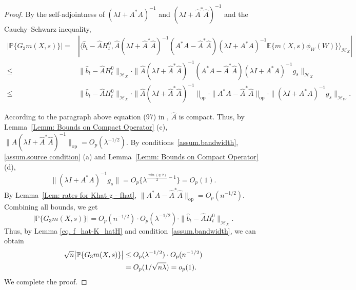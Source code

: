 \documentclass[
  12pt]{article}
\def\wh{\widehat}
\def\mP{\mathbb{P}}
\begin{document}
\begin{proof}
By the self-adjointness of $(\lambda I+A^*A)^{-1}$ and $(\lambda I+\wh{A}^*\wh{A})^{-1}$ and the Cauchy--Schwarz inequality,
\begin{align*}
	\left| \mathbb{P} \{ G_3m(X,s) \}\right|
    =&\left| \langle \widehat{b}_t-\widehat{A}H^0_t,\widehat{A}(\lambda I+\widehat{A}^*\widehat{A})^{-1}(A^*A-\widehat{A}^*\widehat{A})(\lambda I+A^*A)^{-1}\mathbb{E} \{ m(X,s)\phi_W(W)\} \rangle_{\mathcal{H}_X} \right|\\
    \le&\| \widehat{b}_t-\widehat{A}H^0_t\|_{\mathcal{H}_X}\cdot \| \widehat{A}(\lambda I+\widehat{A}^*\widehat{A})^{-1}(A^*A-\widehat{A}^*\widehat{A})(\lambda I+A^*A)^{-1}g_s \|_{\mathcal{H}_X}\\
	\le&\| \widehat{b}_t-\widehat{A}H^0_t\|_{\mathcal{H}_X}\cdot \| \widehat{A}(\lambda I+\widehat{A}^*\widehat{A})^{-1}\|_{\mathrm{op}}\cdot \| A^*A-\widehat{A}^*\widehat{A}\|_{\mathrm{op}}\cdot \|( \lambda I+A^*A )^{-1}g_s \|_{\mathcal{H}_W}.
\end{align*}

According to the paragraph above equation (97) in \cite{mastouri2021proximal},  $\wh{A}$ is compact. Thus, by Lemma~\ref{Lemm: Bounds on Compact Operator} (c), $\|\wh{A}(\lambda I+\wh{A}^*\wh{A})^{-1}\|_{\mathrm{op}}=O_p(\lambda^{-1/2})$. By conditions~\ref{assum.bandwidth}, \ref{assum.source condition} (a) and Lemma~\ref{Lemm: Bounds on Compact Operator} (d), 
$$
\|(\lambda I+A^*A)^{-1}g_s\|=O_p\{\lambda^{\frac{\min(\eta,2)}{2}-1}\}=O_p(1).
$$
By Lemma~\ref{Lem: rates for Khat g - fhat}, $\| A^*A-\widehat{A}^*\widehat{A}\|_{\mathrm{op}}=O_p(n^{-1/2})$. Combining all bounds, we get
\begin{equation}\label{eq:G3-front}
    \big|\mP\{G_3m(X,s)\}\big|=O_p(n^{-1/2})\cdot O_p(\lambda^{-1/2})\cdot \| \widehat{b}_t-\widehat{A}H^0_t\|_{\mathcal{H}_X}.
\end{equation}
Thus, by Lemma \ref{eq. f_hat-K_hatH} and condition~\ref{assum.bandwidth}, we can obtain
\begin{align}\label{eq: G3}
\sqrt{n}\big|\mP\{G_3m(X,s)\}\big|
&\le O_p(\lambda^{-1/2})\cdot O_p(n^{-1/2})\notag\\
&= O_p(1/\sqrt{n\lambda})=o_p(1).
\end{align}
We complete the proof.
\end{proof}
\end{document}
